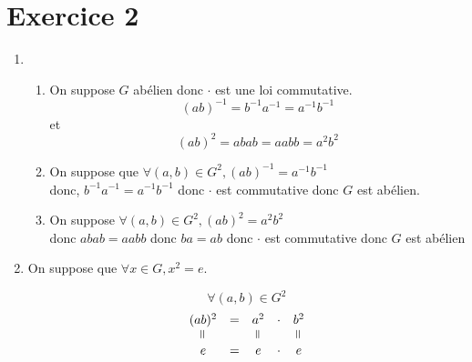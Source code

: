 \part{Exercice 2}

\begin{enumerate}
	\item
		\begin{enumerate}
			\item On suppose $G$ abélien donc $\cdot$ est une loi commutative.
				\[
					(ab)^{-1} = b^{-1}a^{-1}=a^{-1}b^{-1}
				\]
				et \[
					(ab)^2 = abab = aabb = a^2b^2
				\]
			\item On suppose que $\forall (a,b)\in G^2, (ab)^{-1} = a^{-1} b^{-1}$\\
				donc, $b^{-1} a^{-1} = a^{-1} b^{-1}$ donc $\cdot$ est commutative donc $G$ est abélien.
			\item On suppose $\forall (a,b) \in G^2, (ab)^2 = a^2 b^2$\\
				donc $abab=aabb$ donc $ba = ab$ donc $\cdot$ est commutative donc $G$ est abélien
		\end{enumerate}
	\item
		On suppose que $\forall x \in G, x^2 = e$.

		\[\forall (a,b) \in G^2\]
		\begin{align*}
			\begin{array}{c}
				(ab)^2\\
				\vrt=\\
				e
			\end{array}
			\begin{array}{c}
				=\\
				\\
				=\\
			\end{array} 
			\begin{array}{c}
				a^2\\
				\vrt=\\
				e
			\end{array}
			\begin{array}{c}
				\cdot\\
				\\
				\cdot\\
			\end{array} 
			\begin{array}{c}
				b^2\\
				\vrt=\\
				e
			\end{array}
		\end{align*}
\end{enumerate}
